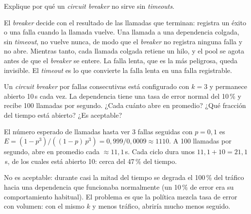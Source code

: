 \documentclass[variant=guia,cover=institutional,mode=screen]{ua-engineering-v6-article}
\begin{document}
\begin{uaexercise}
Explique por qué un \emph{circuit breaker} no sirve sin \emph{timeouts}.
\end{uaexercise}
\begin{uaanswer}
El \emph{breaker} decide con el resultado de las llamadas que terminan: registra un éxito o una falla cuando la llamada vuelve. Una llamada a una dependencia colgada, sin \emph{timeout}, no vuelve nunca, de modo que el \emph{breaker} no registra ninguna falla y no abre. Mientras tanto, cada llamada colgada retiene un hilo, y el pool se agota antes de que el \emph{breaker} se entere. La falla lenta, que es la más peligrosa, queda invisible. El \emph{timeout} es lo que convierte la falla lenta en una falla registrable.
\end{uaanswer}

\begin{uaexercise}
Un \emph{circuit breaker} por fallas consecutivas está configurado con $k = 3$ y permanece abierto 10\,s cada vez. La dependencia tiene una tasa de error normal del 10\,\% y recibe 100 llamadas por segundo. ¿Cada cuánto abre en promedio? ¿Qué fracción del tiempo está abierto? ¿Es aceptable?
\end{uaexercise}
\begin{uaanswer}
El número esperado de llamadas hasta ver 3 fallas seguidas con $p = 0{,}1$ es $E = (1 - p^3)/((1 - p)\,p^3) = 0{,}999 / 0{,}0009 \approx 1110$. A 100 llamadas por segundo, abre en promedio cada $\approx 11{,}1$\,s. Cada ciclo dura unos $11{,}1 + 10 = 21{,}1$\,s, de los cuales está abierto 10: cerca del 47\,\% del tiempo.

No es aceptable: durante casi la mitad del tiempo se degrada el 100\,\% del tráfico hacia una dependencia que funcionaba normalmente (un 10\,\% de error era su comportamiento habitual). El problema es que la política mezcla tasa de error con volumen: con el mismo $k$ y menos tráfico, abriría mucho menos seguido.
\end{uaanswer}
\end{document}
